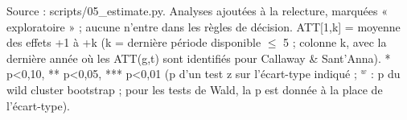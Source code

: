\begin{table}
\begin{threeparttable}
\begin{tabular}{lp{3.8cm}p{4.6cm}lp{3.5cm}rrrrr}
\bottomrule
\end{tabular}
\begin{tablenotes}\footnotesize
\item Source : scripts/05\_estimate.py. Analyses ajoutées à la relecture, marquées « exploratoire » ; aucune n'entre dans les règles de décision. ATT[1,k] = moyenne des effets +1 à +k (k = dernière période disponible $\leq$ 5 ; colonne k, avec la dernière année où les ATT(g,t) sont identifiés pour Callaway \& Sant'Anna). * p<0,10, ** p<0,05, *** p<0,01 (p d'un test z sur l'écart-type indiqué ; $^{w}$ : p du wild cluster bootstrap ; pour les tests de Wald, la p est donnée à la place de l'écart-type).
\end{tablenotes}
\end{threeparttable}
\end{table}
